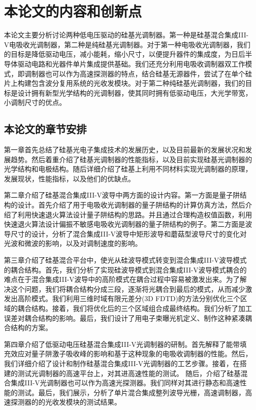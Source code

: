 \section{本论文的内容和创新点}
本论文主要分析讨论两种低电压驱动的硅基光调制器。第一种是硅基混合集成III-V电吸收光调制器，第二种是纯硅基光调制器。对于第一种电吸收光调制器，我们的目标是降低驱动电压，减小能耗，缩小尺寸，以便提升器件的集成度，为日后半导体驱动电路和光器件单片集成提供基础。我们还充分利用电吸收调制器双工作模式，即调制器也可以作为高速探测器的特点，结合硅基无源器件，尝试了在单个硅片上构建包含波分复用系统的光收发模块。对于第二种纯硅基光调制器，我们的目标是设计拥有新型光学结构的光调制器，使其同时拥有低驱动电压，大光学带宽，小调制尺寸的优点。

\subsection{本论文的章节安排}
第一章首先总结了硅基光电子集成技术的发展历史，以及目前最新的发展状况和发展趋势。然后着重介绍了硅基光调制器的性能指标，以及目前实现硅基光调制器的光学结构和电极结构。随后详细介绍了硅基上利用不同材料实现光调制器的原理，发展现状，性能指标，以及他们的优缺点。

第二章介绍了硅基混合集成III-V波导中两方面的设计内容。第一方面是量子阱结构的设计。首先介绍了用于电吸收光调制器的量子阱结构的计算仿真方法，然后介绍了利用快速退火算法设计量子阱结构的思路。并且通过合理构造权值函数，利用快速退火算法设计偏振不敏感电吸收光调制器的量子阱结构的例子。第二方面是波导尺寸的设计，分析了混合集成III-V波导中矩形波导和蘑菇型波导尺寸的变化对光波和微波的影响，以及对调制速度的影响。

第三章介绍了硅基混合平台中，使光从硅波导模式转变到混合集成III-V波导模式的耦合结构。首先，我们分析了实现硅波导模式到混合集成III-V波导模式耦合的难点在于混合集成III-V波导中的高阶模式在耦合过程中容易被激发出来。为了解决这个问题，我们将耦合结构分成三段，逐渐将光耦合到最后的模式，从而减少激发出高阶模式。我们利用三维时域有限元差分(3D FDTD)的方法分别优化三个区域的耦合结构。接着，我们将优化后的三个区域组合成最终结构。我们分析了加工误差对耦合结构的影响。最后，我们设计了用电子束曝光机定义、制作这种紧凑耦合结构的方案。

第四章介绍了低驱动电压硅基混合集成III-V光调制器的研制。首先解释了能带填充效应对量子阱激子吸收峰的影响和基于这种现象的电吸收调制器的性能。然后，我们详细介绍了设计和制作硅基混合集成III-V光调制器的工艺步骤。接着，在搭建的测试光调制器的高速平台上，对其进高速性能的测试。 随后，介绍了硅基混合集成III-V光调制器也可以作为高速光探测器。我们同样对其进行静态和高速性能的测试。最后，我们展示，分析了单片混合集成整列波导光栅，高速调制器，高速探测器的的光收发模块的测试结果。

